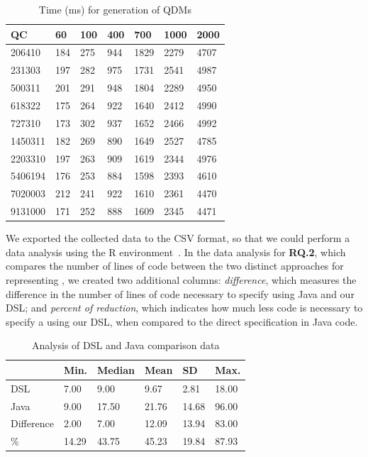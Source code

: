 \begin{table}[htb!]
\centering
\caption{Time (ms) for generation of QDMs}
\label{table:tempo}
\begin{center}
\begin{tabular}{|l|l|l|l|l|l|l|}
\hline
\textbf{QC}      & \textbf{60}  & \textbf{100} & \textbf{400}  & \textbf{700}  & \textbf{1000} & \textbf{2000} \\ \hline

206410  & 184 & 275 & 944  & 1829 & 2279 & 4707 \\ \hline
231303  & 197 & 282 & 975  & 1731 & 2541 & 4987 \\ \hline
500311  & 201 & 291 & 948  & 1804 & 2289 & 4950 \\ \hline
618322  & 175 & 264 & 922  & 1640 & 2412 & 4990 \\ \hline
727310  & 173 & 302 & 937  & 1652 & 2466 & 4992 \\ \hline
1450311 & 182 & 269 & 890  & 1649 & 2527 & 4785 \\ \hline
2203310 & 197 & 263 & 909  & 1619 & 2344 & 4976 \\ \hline
5406194 & 176 & 253 & 884  & 1598 & 2393 & 4610 \\ \hline
7020003 & 212 & 241 & 922  & 1610 & 2361 & 4470 \\ \hline
9131000 & 171 & 252 & 888  & 1609 & 2345 & 4471 \\ \hline
\end{tabular}
\end{center}
\end{table}

We exported the collected data to the CSV format, so that we could perform a data analysis using the R environment~\cite{crawley2013}. 
In the data analysis for \textbf{RQ.2}, which compares the number of lines of code between the two distinct approaches for 
representing \callers, we created two additional columns: \emph{difference}, which measures the difference in the number of 
lines of code necessary to specify \callers using Java and our DSL; and \emph{percent of reduction}, which indicates 
how much less code is necessary to specify a \shc using our DSL, when compared to the direct specification in Java code.

\begin{table}[htb!]
\centering
\caption{Analysis of DSL and Java comparison data}
\label{table:analiseComparacao}
\begin{center}
\begin{tabular}{|l|l|l|l|l|l|}
\hline
           & \textbf{Min.}  & \textbf{Median} & \textbf{Mean}  & \textbf{SD}    & \textbf{Max.}  \\ \hline
DSL        & 7.00  & 9.00   & 9.67  & 2.81  & 18.00 \\ \hline
Java       & 9.00  & 17.50  & 21.76 & 14.68 & 96.00 \\ \hline
Difference & 2.00  & 7.00   & 12.09 & 13.94 & 83.00 \\ \hline
\%         & 14.29 & 43.75  & 45.23 & 19.84 & 87.93 \\ \hline
\end{tabular}
\end{center}
\end{table}

